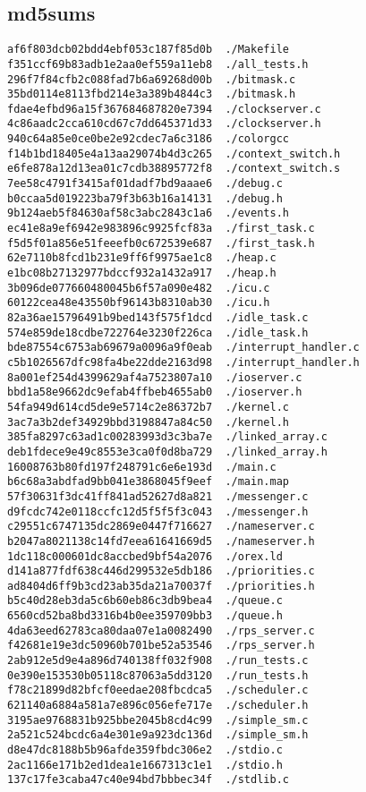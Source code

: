 \documentclass[letterpaper]{article}
\begin{document}
\subsection{md5sums}
\begin{verbatim}
af6f803dcb02bdd4ebf053c187f85d0b  ./Makefile
f351ccf69b83adb1e2aa0ef559a11eb8  ./all_tests.h
296f7f84cfb2c088fad7b6a69268d00b  ./bitmask.c
35bd0114e8113fbd214e3a389b4844c3  ./bitmask.h
fdae4efbd96a15f367684687820e7394  ./clockserver.c
4c86aadc2cca610cd67c7dd645371d33  ./clockserver.h
940c64a85e0ce0be2e92cdec7a6c3186  ./colorgcc
f14b1bd18405e4a13aa29074b4d3c265  ./context_switch.h
e6fe878a12d13ea01c7cdb38895772f8  ./context_switch.s
7ee58c4791f3415af01dadf7bd9aaae6  ./debug.c
b0ccaa5d019223ba79f3b63b16a14131  ./debug.h
9b124aeb5f84630af58c3abc2843c1a6  ./events.h
ec41e8a9ef6942e983896c9925fcf83a  ./first_task.c
f5d5f01a856e51feeefb0c672539e687  ./first_task.h
62e7110b8fcd1b231e9ff6f9975ae1c8  ./heap.c
e1bc08b27132977bdccf932a1432a917  ./heap.h
3b096de077660480045b6f57a090e482  ./icu.c
60122cea48e43550bf96143b8310ab30  ./icu.h
82a36ae15796491b9bed143f575f1dcd  ./idle_task.c
574e859de18cdbe722764e3230f226ca  ./idle_task.h
bde87554c6753ab69679a0096a9f0eab  ./interrupt_handler.c
c5b1026567dfc98fa4be22dde2163d98  ./interrupt_handler.h
8a001ef254d4399629af4a7523807a10  ./ioserver.c
bbd1a58e9662dc9efab4ffbeb4655ab0  ./ioserver.h
54fa949d614cd5de9e5714c2e86372b7  ./kernel.c
3ac7a3b2def34929bbd3198847a84c50  ./kernel.h
385fa8297c63ad1c00283993d3c3ba7e  ./linked_array.c
deb1fdece9e49c8553e3ca0f0d8ba729  ./linked_array.h
16008763b80fd197f248791c6e6e193d  ./main.c
b6c68a3abdfad9bb041e3868045f9eef  ./main.map
57f30631f3dc41ff841ad52627d8a821  ./messenger.c
d9fcdc742e0118ccfc12d5f5f5f3c043  ./messenger.h
c29551c6747135dc2869e0447f716627  ./nameserver.c
b2047a8021138c14fd7eea61641669d5  ./nameserver.h
1dc118c000601dc8accbed9bf54a2076  ./orex.ld
d141a877fdf638c446d299532e5db186  ./priorities.c
ad8404d6ff9b3cd23ab35da21a70037f  ./priorities.h
b5c40d28eb3da5c6b60eb86c3db9bea4  ./queue.c
6560cd52ba8bd3316b4b0ee359709bb3  ./queue.h
4da63eed62783ca80daa07e1a0082490  ./rps_server.c
f42681e19e3dc50960b701be52a53546  ./rps_server.h
2ab912e5d9e4a896d740138ff032f908  ./run_tests.c
0e390e153530b05118c87063a5dd3120  ./run_tests.h
f78c21899d82bfcf0eedae208fbcdca5  ./scheduler.c
621140a6884a581a7e896c056efe717e  ./scheduler.h
3195ae9768831b925bbe2045b8cd4c99  ./simple_sm.c
2a521c524bcdc6a4e301e9a923dc136d  ./simple_sm.h
d8e47dc8188b5b96afde359fbdc306e2  ./stdio.c
2ac1166e171b2ed1dea1e1667313c1e1  ./stdio.h
137c17fe3caba47c40e94bd7bbbec34f  ./stdlib.c

\end{verbatim}
\end{document}
